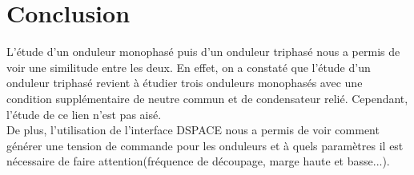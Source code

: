 \documentclass[10pt,a4paper]{article}
\begin{document}
	\section{Conclusion}
	L'étude d'un onduleur monophasé puis d'un onduleur triphasé nous a permis de voir une similitude entre les deux. En effet, on a constaté que l'étude d'un onduleur triphasé revient à étudier trois onduleurs monophasés avec une condition supplémentaire de neutre commun et de condensateur relié. Cependant, l'étude de ce lien n'est pas aisé.\\
	
	De plus, l'utilisation de l'interface DSPACE nous a permis de voir comment générer une tension de commande pour les onduleurs et à quels paramètres il est nécessaire de faire attention(fréquence de découpage, marge haute et basse...).
\end{document}
